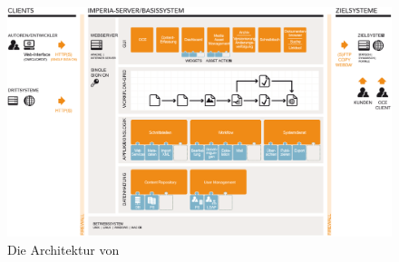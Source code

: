         \begin{figure}[hbt]
            \centering
            \includegraphics[width=\textwidth]{../resources/imperia/architektur.png}
            \caption{Die Architektur von {\imperia} \cite{imperia:ecmd}}
            \label{image:imperiaArchitektur}
        \end{figure}